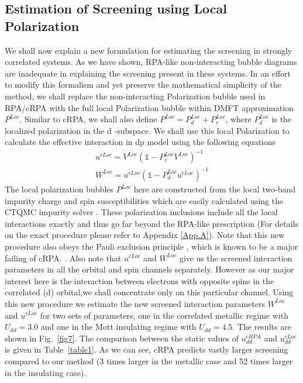 \documentclass[10pt]{ruthesis}
\begin{document}
{\subsection{\label{Local Screening} Estimation of Screening using Local Polarization}

We shall now explain a new formulation for estimating the screening in strongly correlated systems. As we have shown, RPA-like non-interacting bubble diagrams are inadequate in explaining the screening present in these systems. In an effort to modify this formalism and yet preserve the mathematical simplicity of the method, we shall replace the non-interacting Polarization bubble used in RPA/cRPA with the full local Polarization bubble within DMFT approximation $P^{Loc}$. Similar to cRPA, we shall also define $P^{Loc}=P_d^{Loc}+P_r^{Loc}$, where $P^{Loc}_d$ is the localized polarization in the d -subspace. We shall use this local Polarization to calculate the effective interaction in dp model using the following equations
\begin{align}\label{Uloc_def}
u^{cLoc}=V^{Loc}(\mathbb{1}- P_r^{Loc}V^{Loc})^{-1} \\
W^{Loc}=u^{cLoc}(\mathbb{1}-P_d^{Loc} u^{cLoc})^{-1}
\end{align} 
The local polarization bubbles $P^{Loc}$ here are constructed from the local two-band impurity charge and spin susceptibilities which are easily calculated using the CTQMC impurity solver \cite{Chakrabarti_Cerium}. These polarization inclusions include all the local interactions exactly and thus go far beyond the RPA-like prescription (For details on the exact procedure please refer to Appendix \ref{App.A}). Note that this new procedure also obeys the Pauli exclusion principle , which is known to be a major failing of cRPA. \cite{PRB_AccurayofcRPA_2014_P.Werner}. Also note that $u^{cLoc}$ and $W^{Loc}$ give us the screened interaction parameters in all the orbital and spin channels separately. However as  our major interest here is  the interaction between electrons with opposite spins in the correlated (d) orbital,we shall concentrate only on this particular channel. Using this new procedure we estimate the new screened interaction parameters $W^{Loc}$ and $u^{cLoc}$ for two sets of parameters, one in the correlated metallic regime with $U_{dd}=3.0$ and one in the Mott insulating regime with $U_{dd}=4.5$. The results are shown in Fig.~\ref{fig7}. The comparison between the static values of $u^{cRPA}_{dd}$ and $u^{cLoc}_{dd}$ is given in Table~\ref{table1}. As we can see, cRPA predicts vastly larger screening compared to our method (3 times larger in the metallic case and 52 times larger in the insulating case).
}
\end{document}
